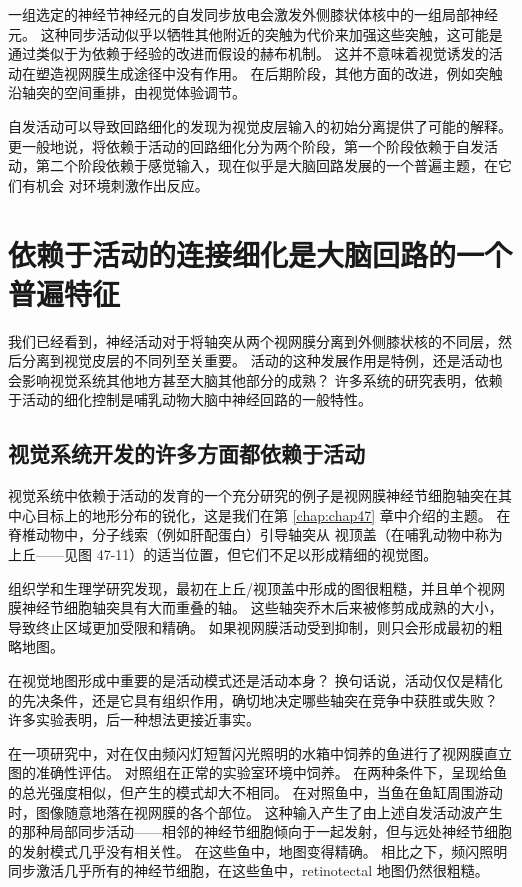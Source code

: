 一组选定的神经节神经元的自发同步放电会激发外侧膝状体核中的一组局部神经元。
这种同步活动似乎以牺牲其他附近的突触为代价来加强这些突触，这可能是通过类似于为依赖于经验的改进而假设的赫布机制。
这并不意味着视觉诱发的活动在塑造视网膜生成途径中没有作用。
在后期阶段，其他方面的改进，例如突触沿轴突的空间重排，由视觉体验调节。


自发活动可以导致回路细化的发现为视觉皮层输入的初始分离提供了可能的解释。
更一般地说，将依赖于活动的回路细化分为两个阶段，第一个阶段依赖于自发活动，第二个阶段依赖于感觉输入，现在似乎是大脑回路发展的一个普遍主题，在它们有机会 对环境刺激作出反应。


\section{依赖于活动的连接细化是大脑回路的一个普遍特征}

我们已经看到，神经活动对于将轴突从两个视网膜分离到外侧膝状核的不同层，然后分离到视觉皮层的不同列至关重要。
活动的这种发展作用是特例，还是活动也会影响视觉系统其他地方甚至大脑其他部分的成熟？
许多系统的研究表明，依赖于活动的细化控制是哺乳动物大脑中神经回路的一般特性。



\subsection{视觉系统开发的许多方面都依赖于活动}

视觉系统中依赖于活动的发育的一个充分研究的例子是视网膜神经节细胞轴突在其中心目标上的地形分布的锐化，这是我们在第 \ref{chap:chap47} 章中介绍的主题。
在脊椎动物中，分子线索（例如肝配蛋白）引导轴突从 视顶盖（在哺乳动物中称为上丘——见图 47-11）的适当位置，但它们不足以形成精细的视觉图。


组织学和生理学研究发现，最初在上丘/视顶盖中形成的图很粗糙，并且单个视网膜神经节细胞轴突具有大而重叠的轴。
这些轴突乔木后来被修剪成成熟的大小，导致终止区域更加受限和精确。
如果视网膜活动受到抑制，则只会形成最初的粗略地图。


在视觉地图形成中重要的是活动模式还是活动本身？
换句话说，活动仅仅是精化的先决条件，还是它具有组织作用，确切地决定哪些轴突在竞争中获胜或失败？
许多实验表明，后一种想法更接近事实。


在一项研究中，对在仅由频闪灯短暂闪光照明的水箱中饲养的鱼进行了视网膜直立图的准确性评估。
对照组在正常的实验室环境中饲养。
在两种条件下，呈现给鱼的总光强度相似，但产生的模式却大不相同。
在对照鱼中，当鱼在鱼缸周围游动时，图像随意地落在视网膜的各个部位。
这种输入产生了由上述自发活动波产生的那种局部同步活动——相邻的神经节细胞倾向于一起发射，但与远处神经节细胞的发射模式几乎没有相关性。
在这些鱼中，地图变得精确。
相比之下，频闪照明同步激活几乎所有的神经节细胞，在这些鱼中，retinotectal 地图仍然很粗糙。


